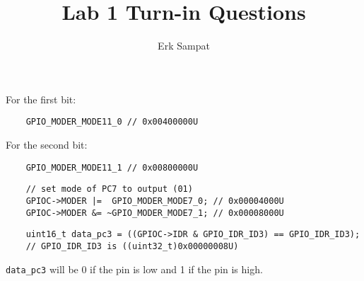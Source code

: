 

\title{Lab 1 Turn-in Questions}
\author{Erk Sampat}

\maketitle
\prob
For the first bit:
\begin{verbatim}
	GPIO_MODER_MODE11_0 // 0x00400000U
\end{verbatim}
For the second bit:
\begin{verbatim}
	GPIO_MODER_MODE11_1 // 0x00800000U
\end{verbatim}
\prob
\begin{verbatim}
	// set mode of PC7 to output (01)
	GPIOC->MODER |=  GPIO_MODER_MODE7_0; // 0x00004000U
	GPIOC->MODER &= ~GPIO_MODER_MODE7_1; // 0x00008000U
\end{verbatim}
\prob
\begin{verbatim}
	uint16_t data_pc3 = ((GPIOC->IDR & GPIO_IDR_ID3) == GPIO_IDR_ID3);
	// GPIO_IDR_ID3 is ((uint32_t)0x00000008U)
\end{verbatim}
\texttt{data\_pc3} will be 0 if the pin is low and 1 if the pin is high.
